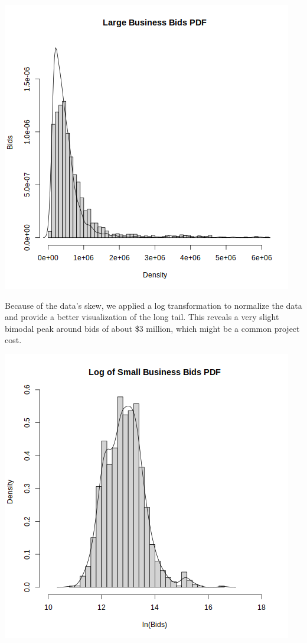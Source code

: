 \includegraphics[scale=0.75]{lb-pdf.png}

Because of the data's skew, we applied a log transformation to
normalize the data and provide a better visualization of the long tail.
This reveals a very slight bimodal peak around bids of about \$3 million,
which might be a common project cost.

% 

\includegraphics[scale=0.75]{log-sb-pdf.png}

